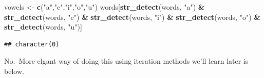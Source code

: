 \documentclass[]{book}
\newenvironment{Shaded}{\begin{snugshade}}{\end{snugshade}}
\newcommand{\DataTypeTok}[1]{\textcolor[rgb]{0.13,0.29,0.53}{#1}}
\newcommand{\DecValTok}[1]{\textcolor[rgb]{0.00,0.00,0.81}{#1}}
\newcommand{\KeywordTok}[1]{\textcolor[rgb]{0.13,0.29,0.53}{\textbf{#1}}}
\newcommand{\NormalTok}[1]{#1}
\newcommand{\OperatorTok}[1]{\textcolor[rgb]{0.81,0.36,0.00}{\textbf{#1}}}
\newcommand{\StringTok}[1]{\textcolor[rgb]{0.31,0.60,0.02}{#1}}
\theoremstyle{definition}
\theoremstyle{definition}
\theoremstyle{definition}
\theoremstyle{remark}
\begin{document}
\begin{enumerate}
\begin{Shaded}
\begin{Highlighting}[]
\NormalTok{vowels <-}\StringTok{ }\KeywordTok{c}\NormalTok{(}\StringTok{"a"}\NormalTok{,}\StringTok{"e"}\NormalTok{,}\StringTok{"i"}\NormalTok{,}\StringTok{"o"}\NormalTok{,}\StringTok{"u"}\NormalTok{)}
\NormalTok{words[}\KeywordTok{str_detect}\NormalTok{(words, }\StringTok{"a"}\NormalTok{) }\OperatorTok{&}
\StringTok{        }\KeywordTok{str_detect}\NormalTok{(words, }\StringTok{"e"}\NormalTok{) }\OperatorTok{&}
\StringTok{        }\KeywordTok{str_detect}\NormalTok{(words, }\StringTok{"i"}\NormalTok{) }\OperatorTok{&}
\StringTok{        }\KeywordTok{str_detect}\NormalTok{(words, }\StringTok{"o"}\NormalTok{) }\OperatorTok{&}\StringTok{ }
\StringTok{        }\KeywordTok{str_detect}\NormalTok{(words, }\StringTok{"u"}\NormalTok{)]}
\end{Highlighting}
\end{Shaded}

\begin{verbatim}
## character(0)
\end{verbatim}

  No.~More elgant way of doing this using iteration methods we'll learn
  later is below.

\begin{Shaded}
\end{Shaded}


\end{enumerate}
\end{document}
